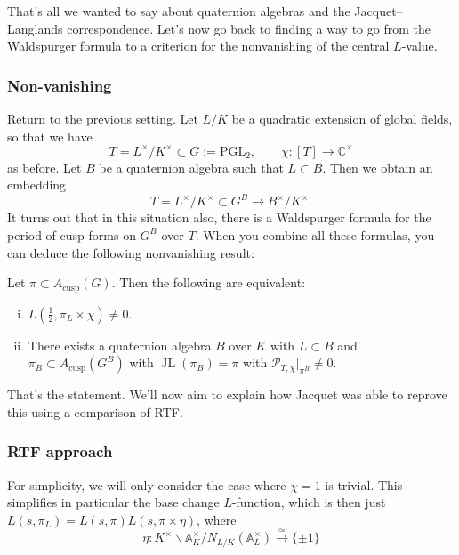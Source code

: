 \documentclass[reqno]{amsart} 
\numberwithin{theorem}{section}
\numberwithin{equation}{section}
\numberwithin{exercise}{section}
\begin{document}
That's all we wanted to say about quaternion algebras and the Jacquet--Langlands correspondence.  Let's now go back to finding a way to go from the Waldspurger formula to a criterion for the nonvanishing of the central $L$-value.

\subsubsection{Non-vanishing}\label{sec:cq6tyamcm6}

Return to the previous setting.  Let $L / K$ be a quadratic extension of global fields, so that we have
\begin{equation*}
  T = L^\times / K^\times \subset G := \mathrm{PGL}_2, \qquad \chi :[T] \rightarrow \mathbb{C}^\times
\end{equation*}
as before.  Let $B$ be a quaternion algebra such that $L \subset B$.  Then we obtain an embedding
\begin{equation*}
  T = L^\times / K^\times \subset G^B \rightarrow B^\times / K^\times.
\end{equation*}
It turns out that in this situation also, there is a Waldspurger formula for the period of cusp forms on $G^B$ over $T$.  When you combine all these formulas, you can deduce the following nonvanishing result:
\begin{theorem}[Waldspurger]\label{theorem:cq6tyal0fv}
  Let $\pi \subset A_{\mathrm{cusp}}(G)$.  Then the following are equivalent:
  \begin{enumerate}[(i)]
  \item $L(\tfrac{1}{2}, \pi_L \times \chi) \neq 0$.
  \item There exists a quaternion algebra $B$ over $K$ with $L \subset B$ and $\pi_B \subset A_{\mathrm{cusp}}(G^B)$ with $\operatorname{JL}(\pi_B) = \pi$ with $\mathcal{P}_{T, \chi} |_{\pi^B} \neq 0$.
  \end{enumerate}
\end{theorem}
That's the statement.  We'll now aim to explain how Jacquet was able to reprove this using a comparison of RTF.

\subsubsection{RTF approach}\label{sec:cq6tyamdej}

For simplicity, we will only consider the case where $\chi = 1$ is trivial.  This simplifies in particular the base change $L$-function, which is then just $L(s, \pi_L) = L(s, \pi) L(s, \pi \times \eta)$, where
\begin{equation*}
  \eta : K^\times \backslash \mathbb{A}_K^\times / N_{L / K}(\mathbb{A}_L^\times) \xrightarrow{\simeq} \{\pm 1\}
\end{equation*}
\end{document}
